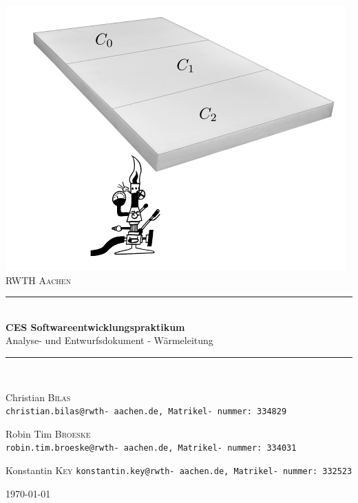 \begin{titlepage}

\begin{center}


\includegraphics[scale=1]{../Quellcode/AppIcon.PNG}\\[1cm]    

\textsc{\LARGE RWTH Aachen}\\[1.5cm]

\newcommand{\HRule}{\rule{\linewidth}{0.5mm}}
\HRule \\[0.4cm]
{ \huge \bfseries CES Softwareentwicklungspraktikum}\\[0.4cm]
{\Large Analyse- und Entwurfsdokument - Wärmeleitung}\\[0.5cm]
\HRule \\[1.5cm]

\begin{minipage}{0.3\textwidth}
\begin{flushleft} \large
Christian \textsc{Bilas}\\
\texttt{christian.bilas@rwth- aachen.de, Matrikel- nummer: 334829}
\end{flushleft}
\end{minipage}
\hfill
\begin{minipage}{0.35\textwidth}
\begin{center} \large
Robin Tim \textsc{Broeske}\\
\texttt{robin.tim.broeske@rwth- aachen.de, Matrikel- nummer: 334031}
\end{center}
\end{minipage}
\hfill
\begin{minipage}{0.3\textwidth}
\begin{flushright} \large
Konstantin \textsc{Key}
\texttt{konstantin.key@rwth- aachen.de, Matrikel- nummer: 332523}
\end{flushright}
\end{minipage}

\vfill

{\large \today}

\end{center}

\end{titlepage}